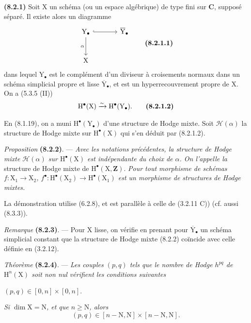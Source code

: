 \documentclass[11pt,leqno]{article}
\begin{document}
\textbf{(8.2.1)} Soit \(\mathrm{X}\) un schéma (ou un espace algébrique) de type fini sur \(\mathbf{C}\), supposé séparé. Il existe alors un diagramme
\[
\begin{tikzcd}[column sep=large,row sep=large]
\mathrm{Y}_\bullet \arrow[r,hook] \arrow[d,"\alpha"']
  & \overline{\mathrm{Y}}_\bullet\\
\mathrm{X} &
\end{tikzcd}
\tag*{\textbf{(8.2.1.1)}}
\]
dans lequel \(\mathrm{Y}_\bullet\) est le complément d’un diviseur à croisements normaux dans un schéma simplicial propre et lisse \(\overline{\mathrm{Y}}_\bullet\), et est un hyperrecouvrement propre de \(\mathrm{X}\). On a (5.3.5 (II))
\[
\mathrm{H}^\bullet(\mathrm{X})
\xrightarrow{\sim}\mathrm{H}^\bullet(\mathrm{Y}_\bullet).
\tag*{\textbf{(8.2.1.2)}}
\]

En (8.1.19), on a muni \(\mathrm{H}^\bullet(\mathrm{Y}_\bullet)\) d’une structure de Hodge mixte. Soit \(\mathcal{H}(\alpha)\) la structure de Hodge mixte sur \(\mathrm{H}^\bullet(\mathrm{X})\) qui s’en déduit par (8.2.1.2).

\textit{Proposition} \textbf{(8.2.2)}. — \textit{Avec les notations précédentes, la structure de Hodge mixte \(\mathcal{H}(\alpha)\) sur \(\mathrm{H}^\bullet(\mathrm{X})\) est indépendante du choix de \(\alpha\). On l’appelle la} structure de Hodge mixte de \(\mathrm{H}^\bullet(\mathrm{X},\mathbf{Z})\). \textit{Pour tout morphisme de schémas \(f:\mathrm{X}_1\to\mathrm{X}_2\), \(f^\bullet:\mathrm{H}^\bullet(\mathrm{X}_2)\to\mathrm{H}^\bullet(\mathrm{X}_1)\) est un morphisme de structures de Hodge mixtes.}

La démonstration utilise (6.2.8), et est parallèle à celle de (3.2.11 C)) (cf. aussi (8.3.3)).

\textit{Remarque} \textbf{(8.2.3)}. — Pour \(\mathrm{X}\) lisse, on vérifie en prenant pour \(\overline{\mathrm{Y}}_\bullet\) un schéma simplicial constant que la structure de Hodge mixte (8.2.2) coïncide avec celle définie en (3.2.12).

\textit{Théorème} \textbf{(8.2.4)}. — \textit{Les couples \((p,q)\) tels que le nombre de Hodge \(h^{pq}\) de \(\mathrm{H}^n(\mathrm{X})\) soit non nul vérifient les conditions suivantes}

\noindent\hspace*{\parindent}
\((p,q)\in[0,n]\times[0,n]\).

\noindent\hspace*{\parindent}
\textit{Si \(\dim\mathrm{X}=\mathrm{N}\), et que \(n\geq\mathrm{N}\), alors}
\[
(p,q)\in[n-\mathrm{N},\mathrm{N}]\times[n-\mathrm{N},\mathrm{N}].
\]
\end{document}
